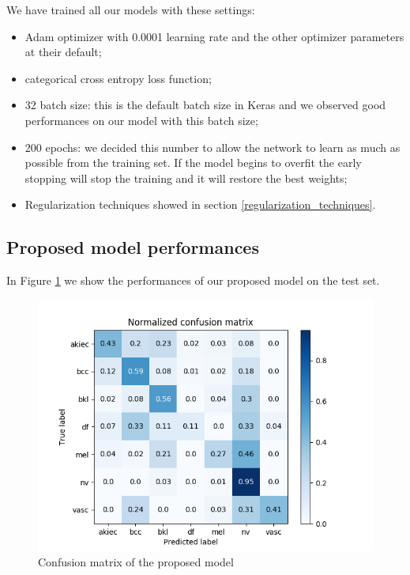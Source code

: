			We have trained all our models with these settings:
			\begin{itemize}
				\item Adam optimizer with 0.0001 learning rate and the other optimizer parameters at their default;
				\item categorical cross entropy loss function;
				\item 32 batch size: this is the default batch size in Keras and we observed good performances on our model with this batch size;
				\item 200 epochs: we decided this number to allow the network to learn as much as possible from the training set. If the model begins to overfit the early stopping will stop the training and it will restore the best weights;
				\item Regularization techniques showed in section \ref{regularization_techniques}.
			\end{itemize}
		
	\subsection{Proposed model performances}
	
		In Figure \ref{fig:first-matrix} we show the performances of our proposed model on the test set. 
		
		\begin{figure}[H]
			\centering
			\includegraphics[width=15cm]{images/firstMatrix.png}
			\caption{Confusion matrix of the proposed model}
			\label{fig:first-matrix}
		\end{figure}
		
